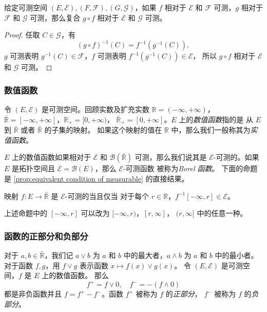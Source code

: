 \documentclass[fontset=none]{Notes}
\begin{document}
\begin{proposition}
  给定可测空间 $(E,\mathcal{E}),(F,\mathcal{F}),(G,\mathcal{G})$，如果 $f$ 相对于 $\mathcal{E}$ 和 
  $\mathcal{F}$ 可测，$g$ 相对于 $\mathcal{F}$ 和 $\mathcal{G}$ 可测，那么复合
  $g\circ f$ 相对于 $\mathcal{E}$ 和 $\mathcal{G}$ 可测。
\end{proposition}
\begin{proof}
  任取 $C\in \mathcal{G}$，有
  \[
    (g\circ f)^{-1}(C)=f^{-1}\left(g^{-1}(C)\right),  
  \]
  $g$ 可测表明 $g^{-1}(C)\in \mathcal{F}$，$f$ 可测表明 $f^{-1}\left(g^{-1}(C)\right)\in \mathcal{E}$，
  所以 $g\circ f$ 相对于 $\mathcal{E}$ 和 $\mathcal{G}$ 可测。
\end{proof}

\subsubsection{数值函数}

令 $(E,\mathcal{E})$ 是可测空间。回顾实数及扩充实数 $\mathbb{R}=(-\infty,+\infty)$，
$\bar{\mathbb{R}}=[-\infty,+\infty]$，$\mathbb{R}_+=[0,+\infty)$，
$\bar{\mathbb{R}}_+=[0,+\infty]$。$E$ 上的\emph{数值函数}指的是
从 $E$ 到 $\bar{\mathbb{R}}$ 或者 $\bar{\mathbb{R}}$ 的子集的映射。
如果这个映射的值在 $\mathbb{R}$ 中，那么我们一般称其为\emph{实值函数}。

$E$ 上的数值函数如果相对于 $\mathcal{E}$ 和 $\mathcal{B}(\bar{\mathbb{R}})$
可测，那么我们说其是 $\mathcal{E}$-可测的。如果 $E$
是拓扑空间且 $\mathcal{E}=\mathcal{B}(E)$，那么 $\mathcal{E}$-可测函数
被称为\emph{Borel 函数}。
下面的命题是 \autoref{prop:equivalent condition of measurable} 的直接结果。

\begin{proposition}
  映射 $f:E\to\bar{\mathbb{R}}$ 是 $\mathcal{E}$-可测的当且仅当
  对于每个 $r\in \mathbb{R}$，$f^{-1}[-\infty,r]\in \mathcal{E}$。
\end{proposition}

上述命题中的 $[-\infty,r]$ 可以改为 $[-\infty,r)$，$[r,\infty]$，
$(r,\infty]$ 中的任意一种。

\subsubsection{函数的正部分和负部分}

对于 $a,b\in\bar{\mathbb{R}}$，我们记 $a\vee b$ 为 $a$ 和 $b$
中的最大者，$a\wedge b$ 为 $a$ 和 $b$ 中的最小者。
对于函数 $f,g$，用 $f\vee g$ 表示函数 $x\mapsto f(x)\vee g(x)$。
令 $(E,\mathcal{E})$ 是可测空间，$f$ 是 $E$ 上的数值函数。
那么
\[
  f^+=f\vee 0,\quad f^-=-(f\wedge 0)  
\]
都是非负函数并且 $f=f^+-f^-$。函数 $f^+$ 被称为 $f$ 的\emph{正部分}，
$f^-$ 被称为 $f$ 的\emph{负部分}。
\end{document}

